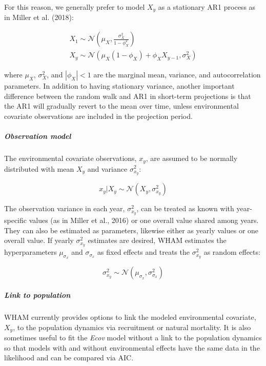 \documentclass[]{article}
\let\oldsubparagraph\subparagraph
\renewcommand{\subparagraph}[1]{\oldsubparagraph{#1}\mbox{}}
\begin{document}
For this reason, we generally prefer to model \(X_y\) as a stationary
AR1 process as in Miller et al. (2018):

\begin{equation}
  \begin{array}{cc}
    X_1 \sim \mathcal{N} \left( \mu_X, \frac{\sigma^2_X}{1-\phi^2_X} \right) \\
    X_y \sim \mathcal{N} \left( \mu_X(1-\phi_X) + \phi_X X_{y-1}, \sigma^2_X \right)
  \end{array}
\end{equation}

where \(\mu_X\), \(\sigma^2_X\), and \(|\phi_X| < 1\) are the marginal
mean, variance, and autocorrelation parameters. In addition to having
stationary variance, another important difference between the random
walk and AR1 in short-term projections is that the AR1 will gradually
revert to the mean over time, unless environmental covariate
observations are included in the projection period.

\hypertarget{observation-model}{%
\subparagraph{Observation model}\label{observation-model}}

The environmental covariate observations, \(x_y\), are assumed to be
normally distributed with mean \(X_y\) and variance \(\sigma^2_{x_y}\):

\[x_y | X_y \sim \mathcal{N}\left( X_y, \sigma^2_{x_y} \right)\]

The observation variance in each year, \(\sigma^2_{x_y}\), can be
treated as known with year-specific values (as in Miller et al., 2016)
or one overall value shared among years. They can also be estimated as
parameters, likewise either as yearly values or one overall value. If
yearly \(\sigma^2_{x_y}\) estimates are desired, WHAM estimates the
hyperparameters \(\mu_{\sigma_x}\) and \(\sigma_{\sigma_x}\) as fixed
effects and treats the \(\sigma^2_{x_y}\) as random effects:

\[\sigma^2_{x_y} \sim \mathcal{N} \left( \mu_{\sigma_x}, \sigma^2_{\sigma_x} \right)\]

\hypertarget{link-to-population}{%
\subparagraph{Link to population}\label{link-to-population}}

WHAM currently provides options to link the modeled environmental
covariate, \(X_y\), to the population dynamics via recruitment or
natural mortality. It is also sometimes useful to fit the \emph{Ecov}
model without a link to the population dynamics so that models with and
without environmental effects have the same data in the likelihood and
can be compared via AIC.
\end{document}

